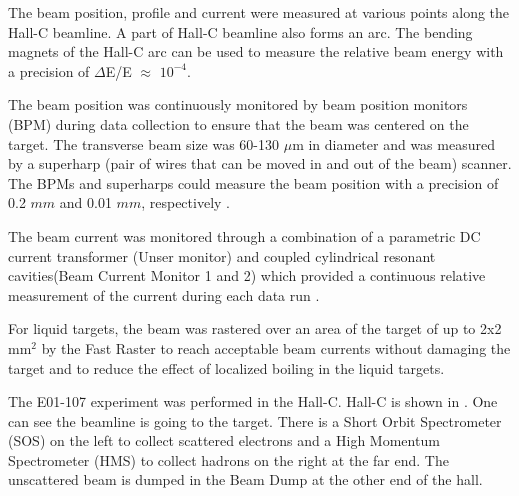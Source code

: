 
\label{Hall-C Beamline}
The beam position, profile and current were measured at various points along the Hall-C beamline. A part of Hall-C beamline also forms an arc. The bending magnets of the Hall-C arc can be used to measure the relative beam energy with a precision of $\Delta$E/E $\approx$ $10^{-4}$.

%
\label{Beam Position Monitor}
The beam position was continuously monitored by beam position monitors (BPM) during data collection to ensure that the beam was centered on the target. The transverse beam size was 60-130 $\mu$m in diameter and was measured by a superharp (pair of wires that can be moved in and out of the beam) scanner. The BPMs and superharps could measure the beam position with a precision of 0.2 $mm$ and 0.01 $mm$, respectively \cite{BC06}.

%
\label{Beam Current Monitor}
The beam current was monitored through a combination of a parametric DC current transformer (Unser monitor) and coupled cylindrical resonant cavities(Beam Current Monitor 1 and 2) which provided a continuous relative measurement of the current during each data run \cite{BC06,RM99}.

%
For liquid targets, the beam was rastered over an area of the target of up to 2x2 mm$^2$ by the Fast Raster to reach acceptable beam currents without damaging the target and to reduce the effect of localized boiling in the liquid targets.

%
\label{Hall-C}
The E01-107 experiment was performed in the Hall-C. Hall-C is shown in . One can see the beamline is going to the target. There is a Short Orbit Spectrometer (SOS) on the left to collect scattered electrons and a High Momentum Spectrometer (HMS) to collect hadrons on the right at the far end. The unscattered beam is dumped in the Beam Dump at the other end of the hall. 

